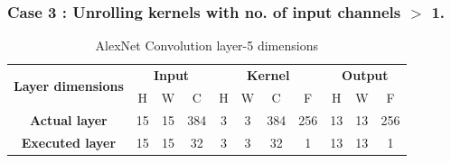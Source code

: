 \subsubsection{Case 3 : Unrolling kernels with no. of input channels $>$ 1.}

\begin{table}[H]
\centering
\caption{AlexNet Convolution layer-5 dimensions}
\label{tab:unrollConvolutionCase3Dim}
 \begin{tabular}{|c|c|c|c|c|c|c|c|c|c|c|} \hline  
 
 \multirow{2}{*}{\textbf{Layer dimensions}} &  
 \multicolumn{3}{|c|}{\textbf{Input}} &  
 \multicolumn{4}{|c|}{\textbf{Kernel}} &  
 \multicolumn{3}{|c|}{\textbf{Output}}\\ \cline{2-11}
 & H &  W &  C&  H &  W &  C &  F &  H &  W & F\\ \hline  
 \textbf{Actual layer} &  15 &  15 & 384 & 3 & 3 & 384 & 256 & 13 & 13 & 256\\ \hline 
 \textbf{Executed layer} &  15 &  15 &  \cellcolor{yellow}32 & 3 & 3 & \cellcolor{yellow}32 & \cellcolor{yellow}1 & 13 & 13 & \cellcolor{yellow}1 \\ \hline 
 \end{tabular}
\end{table}

